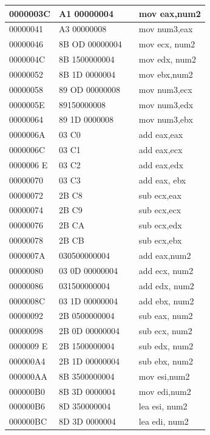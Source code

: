 \documentclass[10pt]{article}
\begin{document}
\begin{center}
\begin{tabular}{|l|l|l|l|}
\hline
0000003C & A1 00000004 &  & mov eax,num2 \\
\hline
00000041 & A3 00000008 &  & mov num3,eax \\
\hline
00000046 & 8B OD 00000004 &  & mov ecx, num2 \\
\hline
0000004C & 8B 1500000004 &  & mov edx, num2 \\
\hline
00000052 & 8B 1D 0000004 &  & mov ebx,num2 \\
\hline
00000058 & 89 OD 00000008 &  & mov num3,ecx \\
\hline
0000005E & 89150000008 &  & mov num3,edx \\
\hline
00000064 & 89 1D 0000008 &  & mov num3,ebx \\
\hline
0000006A & 03 C0 &  & add eax,eax \\
\hline
0000006C & 03 C1 &  & add eax,ecx \\
\hline
0000006 E & 03 C2 &  & add eax,edx \\
\hline
00000070 & 03 C3 &  & add eax, ebx \\
\hline
00000072 & 2B C8 &  & sub ecx,eax \\
\hline
00000074 & 2B C9 &  & sub ecx,ecx \\
\hline
00000076 & 2B CA &  & sub ecx,edx \\
\hline
00000078 & 2B CB &  & sub ecx,ebx \\
\hline
0000007A & 030500000004 &  & add eax,num2 \\
\hline
00000080 & 03 0D 00000004 &  & add ecx, num2 \\
\hline
00000086 & 031500000004 &  & add edx, num2 \\
\hline
0000008C & 03 1D 00000004 &  & add ebx, num2 \\
\hline
00000092 & 2B 0500000004 &  & sub eax, num2 \\
\hline
00000098 & 2B 0D 00000004 &  & sub ecx, num2 \\
\hline
0000009 E & 2B 1500000004 &  & sub edx, num2 \\
\hline
000000A4 & 2B 1D 00000004 &  & sub ebx, num2 \\
\hline
000000AA & 8B 3500000004 &  & mov esi,num2 \\
\hline
000000B0 & 8B 3D 0000004 &  & mov edi,num2 \\
\hline
000000B6 & 8D 350000004 &  & lea esi, num2 \\
\hline
000000BC & 8D 3D 0000004 &  & lea edi, num2 \\

\end{tabular}
\end{center}
\end{document}
